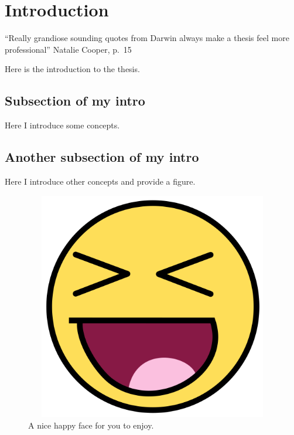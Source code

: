 \chapter{Introduction}
\label{chap:introduction}%

\begin{quoteshrink}
  ``Really grandiose sounding quotes from Darwin always make a thesis feel more professional''
  \hfill{Natalie Cooper, p.~15}
\end{quoteshrink}

\noindent
Here is the introduction to the thesis.

\section{Subsection of my intro}

Here I introduce some concepts.


\section{Another subsection of my intro}

Here I introduce other concepts and provide a figure.

\begin{figure} %
  \centering
  \includegraphics[width = 30cm, height = 10cm, keepaspectratio=true]{introduction/figures/Happy_smiley_face.png}
  \caption[Happy face because I finished]%
  {A nice happy face for you to enjoy.}%
\label{fig:happy}
\end{figure}


